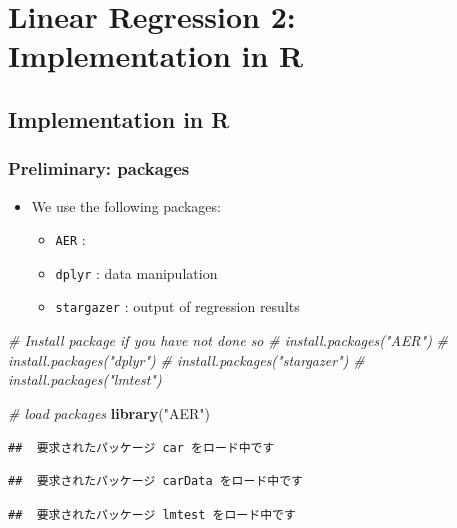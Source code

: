 \documentclass[]{book}
\newenvironment{Shaded}{\begin{snugshade}}{\end{snugshade}}
\newcommand{\KeywordTok}[1]{\textcolor[rgb]{0.13,0.29,0.53}{\textbf{#1}}}
\newcommand{\StringTok}[1]{\textcolor[rgb]{0.31,0.60,0.02}{#1}}
\newcommand{\CommentTok}[1]{\textcolor[rgb]{0.56,0.35,0.01}{\textit{#1}}}
\newcommand{\NormalTok}[1]{#1}
\providecommand{\tightlist}{%
  \setlength{\itemsep}{0pt}\setlength{\parskip}{0pt}}
\begin{document}
\chapter{Linear Regression 2: Implementation in
R}\label{linear-regression-2-implementation-in-r}

\section{Implementation in R}\label{implementation-in-r}

\subsection{Preliminary: packages}\label{preliminary-packages}

\begin{itemize}
\tightlist
\item
  We use the following packages:

  \begin{itemize}
  \tightlist
  \item
    \texttt{AER} :
  \item
    \texttt{dplyr} : data manipulation
  \item
    \texttt{stargazer} : output of regression results
  \end{itemize}
\end{itemize}

\begin{Shaded}
\begin{Highlighting}[]
\CommentTok{# Install package if you have not done so }
\CommentTok{# install.packages("AER")}
\CommentTok{# install.packages("dplyr")}
\CommentTok{# install.packages("stargazer")}
\CommentTok{# install.packages("lmtest")}

\CommentTok{# load packages}
\KeywordTok{library}\NormalTok{(}\StringTok{"AER"}\NormalTok{)}
\end{Highlighting}
\end{Shaded}

\begin{verbatim}
##  要求されたパッケージ car をロード中です
\end{verbatim}

\begin{verbatim}
##  要求されたパッケージ carData をロード中です
\end{verbatim}

\begin{verbatim}
##  要求されたパッケージ lmtest をロード中です
\end{verbatim}
\end{document}
